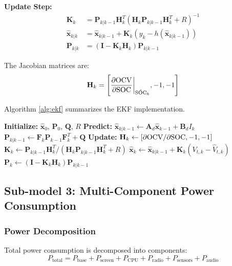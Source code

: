 \textbf{Update Step:}
\begin{align}
\mathbf{K}_k &= \mathbf{P}_{k|k-1} \mathbf{H}_k^T (\mathbf{H}_k \mathbf{P}_{k|k-1} \mathbf{H}_k^T + R)^{-1} \\
\hat{\mathbf{x}}_{k|k} &= \hat{\mathbf{x}}_{k|k-1} + \mathbf{K}_k (y_k - h(\hat{\mathbf{x}}_{k|k-1})) \\
\mathbf{P}_{k|k} &= (\mathbf{I} - \mathbf{K}_k \mathbf{H}_k) \mathbf{P}_{k|k-1}
\end{align}

The Jacobian matrices are:
\begin{equation}
\mathbf{H}_k = \left[\frac{\partial \text{OCV}}{\partial \text{SOC}}\bigg|_{\hat{\text{SOC}}_k}, -1, -1\right]
\end{equation}

Algorithm \ref{alg:ekf} summarizes the EKF implementation.

\begin{algorithm}[H]
\caption{EKF for SOC Estimation}
\label{alg:ekf}
\begin{algorithmic}[1]
\State \textbf{Initialize:} $\hat{\mathbf{x}}_0$, $\mathbf{P}_0$, $\mathbf{Q}$, $R$
    \State \textbf{Predict:}
    \State $\hat{\mathbf{x}}_{k|k-1} \gets \mathbf{A}_d \hat{\mathbf{x}}_{k-1} + \mathbf{B}_d I_k$
    \State $\mathbf{P}_{k|k-1} \gets \mathbf{F}_k \mathbf{P}_{k-1} \mathbf{F}_k^T + \mathbf{Q}$
    \State \textbf{Update:}
    \State $\mathbf{H}_k \gets [\partial \text{OCV}/\partial \text{SOC}, -1, -1]$
    \State $\mathbf{K}_k \gets \mathbf{P}_{k|k-1} \mathbf{H}_k^T / (\mathbf{H}_k \mathbf{P}_{k|k-1} \mathbf{H}_k^T + R)$
    \State $\hat{\mathbf{x}}_k \gets \hat{\mathbf{x}}_{k|k-1} + \mathbf{K}_k (V_{t,k} - \hat{V}_{t,k})$
    \State $\mathbf{P}_k \gets (\mathbf{I} - \mathbf{K}_k \mathbf{H}_k) \mathbf{P}_{k|k-1}$
\EndFor
\end{algorithmic}
\end{algorithm}

\subsection{Sub-model 3: Multi-Component Power Consumption}

\subsubsection{Power Decomposition}

Total power consumption is decomposed into components:
\begin{equation}
P_{\text{total}} = P_{\text{base}} + P_{\text{screen}} + P_{\text{CPU}} + P_{\text{radio}} + P_{\text{sensors}} + P_{\text{audio}}
\label{eq:power_decomp}
\end{equation}

